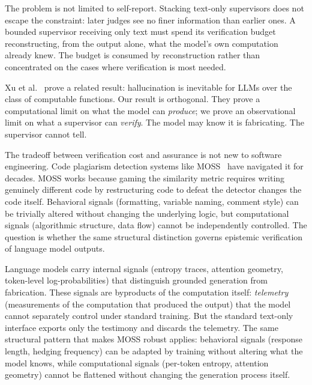 The problem is not limited to self-report. Stacking text-only supervisors
does not escape the constraint: later judges see no finer information than
earlier ones. A bounded supervisor receiving only text must spend its
verification budget reconstructing, from the output alone, what the model's
own computation already knew. The budget is consumed by reconstruction
rather than concentrated on the cases where verification is most needed.


Xu et al.~\cite{xu2024hallucination} prove a related result: hallucination
is inevitable for LLMs over the class of computable functions. Our result is
orthogonal. They prove a computational limit on what the model can
\emph{produce}; we prove an observational limit on what a supervisor can
\emph{verify}. The model may know it is fabricating. The supervisor cannot
tell.

The tradeoff between verification cost and assurance is not new to software
engineering. Code plagiarism detection systems like
MOSS~\cite{schleimer2003winnowing, mason2019collaboration} have navigated
it for decades. MOSS works because gaming the similarity metric requires
writing genuinely different code by restructuring code to defeat the
detector changes the code itself. Behavioral signals (formatting, variable
naming, comment style) can be trivially altered without changing the
underlying logic, but computational signals (algorithmic structure, data
flow) cannot be independently controlled. The question is whether the same
structural distinction governs epistemic verification of language model
outputs.


Language models carry internal signals (entropy traces, attention geometry,
token-level log-probabilities) that distinguish grounded generation from
fabrication. These signals are byproducts of the computation itself:
\emph{telemetry} (measurements of the computation that produced the output)
that the model cannot separately control under standard training. But the
standard text-only interface exports only the testimony and discards the
telemetry. The same structural pattern that makes MOSS robust applies:
behavioral signals (response length, hedging frequency) can be adapted by
training without altering what the model knows, while computational signals
(per-token entropy, attention geometry) cannot be flattened without changing
the generation process itself.

